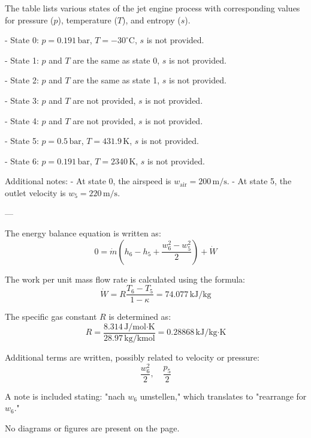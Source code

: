 The table lists various states of the jet engine process with corresponding values for pressure (\( p \)), temperature (\( T \)), and entropy (\( s \)).  

- State 0:  
  \( p = 0.191 \, \text{bar} \), \( T = -30^\circ\text{C} \), \( s \) is not provided.  

- State 1:  
  \( p \) and \( T \) are the same as state 0, \( s \) is not provided.  

- State 2:  
  \( p \) and \( T \) are the same as state 1, \( s \) is not provided.  

- State 3:  
  \( p \) and \( T \) are not provided, \( s \) is not provided.  

- State 4:  
  \( p \) and \( T \) are not provided, \( s \) is not provided.  

- State 5:  
  \( p = 0.5 \, \text{bar} \), \( T = 431.9 \, \text{K} \), \( s \) is not provided.  

- State 6:  
  \( p = 0.191 \, \text{bar} \), \( T = 2340 \, \text{K} \), \( s \) is not provided.  

Additional notes:  
- At state 0, the airspeed is \( w_{\text{air}} = 200 \, \text{m/s} \).  
- At state 5, the outlet velocity is \( w_5 = 220 \, \text{m/s} \).  

---

The energy balance equation is written as:  
\[
0 = \dot{m} \left( h_6 - h_5 + \frac{w_6^2 - w_5^2}{2} \right) + \dot{W}
\]  

The work per unit mass flow rate is calculated using the formula:  
\[
\dot{W} = R \frac{T_6 - T_5}{1 - \kappa} = 74.077 \, \text{kJ/kg}
\]  

The specific gas constant \( R \) is determined as:  
\[
R = \frac{8.314 \, \text{J/mol·K}}{28.97 \, \text{kg/kmol}} = 0.28868 \, \text{kJ/kg·K}
\]  

Additional terms are written, possibly related to velocity or pressure:  
\[
\frac{w_6^2}{2}, \quad \frac{p_5}{2}
\]  

A note is included stating:  
"nach \( w_6 \) umstellen,"  
which translates to "rearrange for \( w_6 \)."  

No diagrams or figures are present on the page.